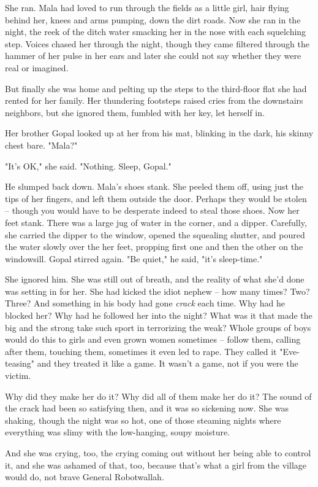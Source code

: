 She ran. Mala had loved to run through the fields as a little girl,
hair flying behind her, knees and arms pumping, down the dirt
roads. Now she ran in the night, the reek of the ditch water
smacking her in the nose with each squelching step. Voices chased
her through the night, though they came filtered through the hammer
of her pulse in her ears and later she could not say whether they
were real or imagined.

But finally she was home and pelting up the steps to the
third-floor flat she had rented for her family. Her thundering
footsteps raised cries from the downstairs neighbors, but she
ignored them, fumbled with her key, let herself in.

Her brother Gopal looked up at her from his mat, blinking in the
dark, his skinny chest bare. "Mala?"

"It's OK," she said. "Nothing. Sleep, Gopal."

He slumped back down. Mala's shoes stank. She peeled them off,
using just the tips of her fingers, and left them outside the door.
Perhaps they would be stolen -- though you would have to be
desperate indeed to steal those shoes. Now her feet stank. There
was a large jug of water in the corner, and a dipper. Carefully,
she carried the dipper to the window, opened the squealing shutter,
and poured the water slowly over the her feet, propping first one
and then the other on the windowsill. Gopal stirred again. "Be
quiet," he said, "it's sleep-time."

She ignored him. She was still out of breath, and the reality of
what she'd done was setting in for her. She had kicked the idiot
nephew -- how many times? Two? Three? And something in his body had
gone \emph{crack} each time. Why had he blocked her? Why had he
followed her into the night? What was it that made the big and the
strong take such sport in terrorizing the weak? Whole groups of
boys would do this to girls and even grown women sometimes --
follow them, calling after them, touching them, sometimes it even
led to rape. They called it "Eve-teasing" and they treated it like
a game. It wasn't a game, not if you were the victim.

Why did they make her do it? Why did all of them make her do it?
The sound of the crack had been so satisfying then, and it was so
sickening now. She was shaking, though the night was so hot, one of
those steaming nights where everything was slimy with the
low-hanging, soupy moisture.

And she was crying, too, the crying coming out without her being
able to control it, and she was ashamed of that, too, because
that's what a girl from the village would do, not brave General
Robotwallah.

